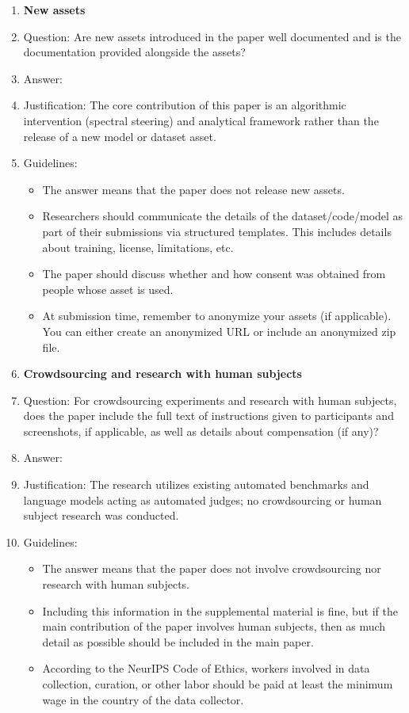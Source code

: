 \documentclass{article}
\begin{document}
\begin{enumerate}
\item {\bf New assets}
    \item[] Question: Are new assets introduced in the paper well documented and is the documentation provided alongside the assets?
    \item[] Answer: \answerNA{}
    \item[] Justification: The core contribution of this paper is an algorithmic intervention (spectral steering) and analytical framework rather than the release of a new model or dataset asset.
    \item[] Guidelines:
    \begin{itemize}
        \item The answer \answerNA{} means that the paper does not release new assets.
        \item Researchers should communicate the details of the dataset\slash code\slash model as part of their submissions via structured templates. This includes details about training, license, limitations, etc. 
        \item The paper should discuss whether and how consent was obtained from people whose asset is used.
        \item At submission time, remember to anonymize your assets (if applicable). You can either create an anonymized URL or include an anonymized zip file.
    \end{itemize}

\item {\bf Crowdsourcing and research with human subjects}
    \item[] Question: For crowdsourcing experiments and research with human subjects, does the paper include the full text of instructions given to participants and screenshots, if applicable, as well as details about compensation (if any)? 
    \item[] Answer: \answerNA{}
    \item[] Justification: The research utilizes existing automated benchmarks and language models acting as automated judges; no crowdsourcing or human subject research was conducted.
    \item[] Guidelines:
    \begin{itemize}
        \item The answer \answerNA{} means that the paper does not involve crowdsourcing nor research with human subjects.
        \item Including this information in the supplemental material is fine, but if the main contribution of the paper involves human subjects, then as much detail as possible should be included in the main paper. 
        \item According to the NeurIPS Code of Ethics, workers involved in data collection, curation, or other labor should be paid at least the minimum wage in the country of the data collector. 
    \end{itemize}


\end{enumerate}
\end{document}
